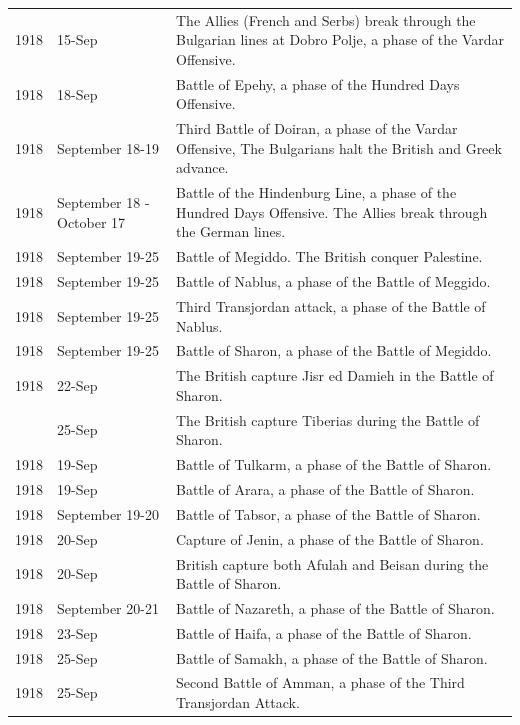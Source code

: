 \documentclass[
  openany]{book}
\begin{document}
\begin{longtable}[t]{rl>{\raggedright\arraybackslash}p{22em}}
\rowcolor{gray!6}  1918 & 15-Sep & The Allies (French and Serbs) break through the Bulgarian lines at Dobro Polje, a phase of the Vardar Offensive.\\
1918 & 18-Sep & Battle of Epehy, a phase of the Hundred Days Offensive.\\
\rowcolor{gray!6}  1918 & September 18-19 & Third Battle of Doiran, a phase of the Vardar Offensive, The Bulgarians halt the British and Greek advance.\\
1918 & September 18 - October 17 & Battle of the Hindenburg Line, a phase of the Hundred Days Offensive. The Allies break through the German lines.\\
\addlinespace
\rowcolor{gray!6}  1918 & September 19-25 & Battle of Megiddo. The British conquer Palestine.\\
1918 & September 19-25 & Battle of Nablus, a phase of the Battle of Meggido.\\
\rowcolor{gray!6}  1918 & September 19-25 & Third Transjordan attack, a phase of the Battle of Nablus.\\
1918 & September 19-25 & Battle of Sharon, a phase of the Battle of Megiddo.\\
\rowcolor{gray!6}  1918 & 22-Sep & The British capture Jisr ed Damieh in the Battle of Sharon.\\
\addlinespace
1918 & 25-Sep & The British capture Tiberias during the Battle of Sharon.\\
\rowcolor{gray!6}  1918 & 19-Sep & Battle of Tulkarm, a phase of the Battle of Sharon.\\
1918 & 19-Sep & Battle of Arara, a phase of the Battle of Sharon.\\
\rowcolor{gray!6}  1918 & September 19-20 & Battle of Tabsor, a phase of the Battle of Sharon.\\
1918 & 20-Sep & Capture of Jenin, a phase of the Battle of Sharon.\\
\addlinespace
\rowcolor{gray!6}  1918 & 20-Sep & British capture both Afulah and Beisan during the Battle of Sharon.\\
1918 & September 20-21 & Battle of Nazareth, a phase of the Battle of Sharon.\\
\rowcolor{gray!6}  1918 & 23-Sep & Battle of Haifa, a phase of the Battle of Sharon.\\
1918 & 25-Sep & Battle of Samakh, a phase of the Battle of Sharon.\\
\rowcolor{gray!6}  1918 & 25-Sep & Second Battle of Amman, a phase of the Third Transjordan Attack.\\

\end{longtable}
\end{document}
